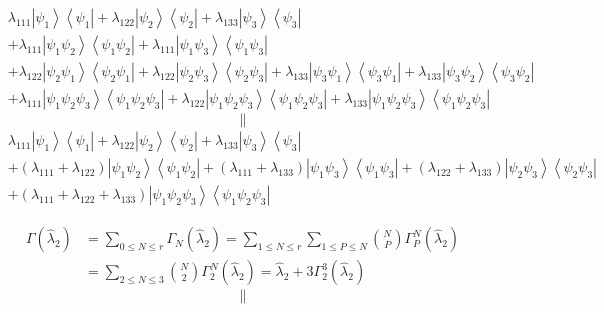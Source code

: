 \documentclass[aps,preprint]{revtex4}%
\begin{document}
\begin{align}
& \lambda_{111}\left\vert \psi_{1}\right\rangle \left\langle \psi
_{1}\right\vert +\lambda_{122}\left\vert \psi_{2}\right\rangle \left\langle
\psi_{2}\right\vert +\lambda_{133}\left\vert \psi_{3}\right\rangle
\left\langle \psi_{3}\right\vert \nonumber\\
& +\lambda_{111}\left\vert \psi_{1}\psi_{2}\right\rangle \left\langle \psi
_{1}\psi_{2}\right\vert +\lambda_{111}\left\vert \psi_{1}\psi_{3}\right\rangle
\left\langle \psi_{1}\psi_{3}\right\vert \nonumber\\
& +\lambda_{122}\left\vert \psi_{2}\psi_{1}\right\rangle \left\langle \psi
_{2}\psi_{1}\right\vert +\lambda_{122}\left\vert \psi_{2}\psi_{3}\right\rangle
\left\langle \psi_{2}\psi_{3}\right\vert +\lambda_{133}\left\vert \psi_{3}%
\psi_{1}\right\rangle \left\langle \psi_{3}\psi_{1}\right\vert +\lambda
_{133}\left\vert \psi_{3}\psi_{2}\right\rangle \left\langle \psi_{3}\psi
_{2}\right\vert \nonumber\\
& +\lambda_{111}\left\vert \psi_{1}\psi_{2}\psi_{3}\right\rangle \left\langle
\psi_{1}\psi_{2}\psi_{3}\right\vert +\lambda_{122}\left\vert \psi_{1}\psi
_{2}\psi_{3}\right\rangle \left\langle \psi_{1}\psi_{2}\psi_{3}\right\vert
+\lambda_{133}\left\vert \psi_{1}\psi_{2}\psi_{3}\right\rangle \left\langle
\psi_{1}\psi_{2}\psi_{3}\right\vert
\end{align}%
\[
\parallel
\]%
\begin{align}
& \lambda_{111}\left\vert \psi_{1}\right\rangle \left\langle \psi
_{1}\right\vert +\lambda_{122}\left\vert \psi_{2}\right\rangle \left\langle
\psi_{2}\right\vert +\lambda_{133}\left\vert \psi_{3}\right\rangle
\left\langle \psi_{3}\right\vert \nonumber\\
& +\left(  \lambda_{111}+\lambda_{122}\right)  \left\vert \psi_{1}\psi
_{2}\right\rangle \left\langle \psi_{1}\psi_{2}\right\vert +\left(
\lambda_{111}+\lambda_{133}\right)  \left\vert \psi_{1}\psi_{3}\right\rangle
\left\langle \psi_{1}\psi_{3}\right\vert +\left(  \lambda_{122}+\lambda
_{133}\right)  \left\vert \psi_{2}\psi_{3}\right\rangle \left\langle \psi
_{2}\psi_{3}\right\vert \nonumber\\
& +\left(  \lambda_{111}+\lambda_{122}+\lambda_{133}\right)  \left\vert
\psi_{1}\psi_{2}\psi_{3}\right\rangle \left\langle \psi_{1}\psi_{2}\psi
_{3}\right\vert
\end{align}


\bigskip%

\begin{align}
\Gamma\left(  \hat{\lambda}_{2}\right)    & =\sum_{0\leq N\leq r}\Gamma
_{N}\left(  \hat{\lambda}_{2}\right)  =\sum_{1\leq N\leq r}\sum_{1\leq P\leq
N}\binom{N}{P}\Gamma_{P}^{N}\left(  \hat{\lambda}_{2}\right)  \nonumber\\
& =\sum_{2\leq N\leq3}\binom{N}{2}\Gamma_{2}^{N}\left(  \hat{\lambda}%
_{2}\right)  =\hat{\lambda}_{2}+3\Gamma_{2}^{3}\left(  \hat{\lambda}%
_{2}\right)
\end{align}%
\[
\parallel
\]
%
\end{document}
